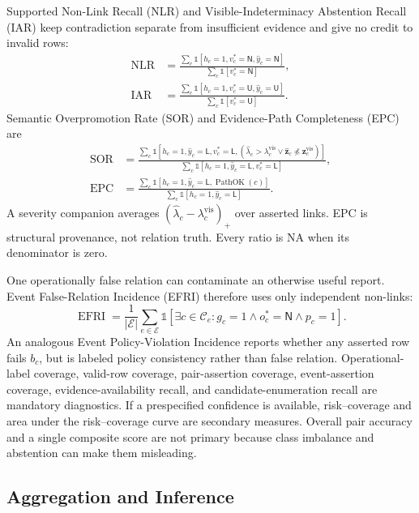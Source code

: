 \documentclass[conference]{IEEEtran}
\newcommand{\NA}{\textsc{NA}}
\begin{document}
Supported Non-Link Recall (NLR) and Visible-Indeterminacy Abstention Recall (IAR) keep contradiction separate from insufficient evidence and give no credit to invalid rows:
\begin{align}
\operatorname{NLR}&=\frac{\sum_c\mathbb{1}[h_c=1,v_c^*=\mathsf{N},\hat y_c=\mathsf{N}]}{\sum_c\mathbb{1}[v_c^*=\mathsf{N}]},\\
\operatorname{IAR}&=\frac{\sum_c\mathbb{1}[h_c=1,v_c^*=\mathsf{U},\hat y_c=\mathsf{U}]}{\sum_c\mathbb{1}[v_c^*=\mathsf{U}]}.
\end{align}
Semantic Overpromotion Rate (SOR) and Evidence-Path Completeness (EPC) are
\begin{align}
\operatorname{SOR}&=\frac{\sum_c\mathbb{1}[h_c=1,\hat y_c=\mathsf{L},v_c^*=\mathsf{L},(\hat\lambda_c>\lambda_c^{\mathrm{vis}}\lor\hat{\mathbf z}_c\npreceq\mathbf z_c^{\mathrm{vis}})]}{\sum_c\mathbb{1}[h_c=1,\hat y_c=\mathsf{L},v_c^*=\mathsf{L}]},\\
\operatorname{EPC}&=\frac{\sum_c\mathbb{1}[h_c=1,\hat y_c=\mathsf{L},\operatorname{PathOK}(c)]}{\sum_c\mathbb{1}[h_c=1,\hat y_c=\mathsf{L}]}.
\end{align}
A severity companion averages $(\hat\lambda_c-\lambda_c^{\mathrm{vis}})_+$ over asserted links. EPC is structural provenance, not relation truth. Every ratio is \NA{} when its denominator is zero.

One operationally false relation can contaminate an otherwise useful report. Event False-Relation Incidence (EFRI) therefore uses only independent non-links:
\begin{equation}
\operatorname{EFRI}=\frac{1}{|\mathcal E|}\sum_{e\in\mathcal E}\mathbb{1}[\exists c\in\mathcal C_e:g_c=1\land o_c^*=\mathsf{N}\land p_c=1].
\end{equation}
An analogous Event Policy-Violation Incidence reports whether any asserted row fails $b_c$, but is labeled policy consistency rather than false relation. Operational-label coverage, valid-row coverage, pair-assertion coverage, event-assertion coverage, evidence-availability recall, and candidate-enumeration recall are mandatory diagnostics. If a prespecified confidence is available, risk--coverage and area under the risk--coverage curve are secondary measures. Overall pair accuracy and a single composite score are not primary because class imbalance and abstention can make them misleading.

\subsection{Aggregation and Inference}
\end{document}
